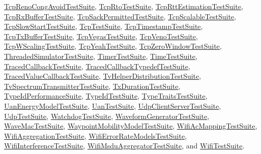\hyperlink{classTcpRenoCongAvoidTestSuite}{Tcp\+Reno\+Cong\+Avoid\+Test\+Suite}, \hyperlink{classTcpRtoTestSuite}{Tcp\+Rto\+Test\+Suite}, \hyperlink{classTcpRttEstimationTestSuite}{Tcp\+Rtt\+Estimation\+Test\+Suite}, \hyperlink{classTcpRxBufferTestSuite}{Tcp\+Rx\+Buffer\+Test\+Suite}, \hyperlink{classTcpSackPermittedTestSuite}{Tcp\+Sack\+Permitted\+Test\+Suite}, \hyperlink{classTcpScalableTestSuite}{Tcp\+Scalable\+Test\+Suite}, \hyperlink{classTcpSlowStartTestSuite}{Tcp\+Slow\+Start\+Test\+Suite}, \hyperlink{classTcpTestSuite}{Tcp\+Test\+Suite}, \hyperlink{classTcpTimestampTestSuite}{Tcp\+Timestamp\+Test\+Suite}, \hyperlink{classTcpTxBufferTestSuite}{Tcp\+Tx\+Buffer\+Test\+Suite}, \hyperlink{classTcpVegasTestSuite}{Tcp\+Vegas\+Test\+Suite}, \hyperlink{classTcpVenoTestSuite}{Tcp\+Veno\+Test\+Suite}, \hyperlink{classTcpWScalingTestSuite}{Tcp\+W\+Scaling\+Test\+Suite}, \hyperlink{classTcpYeahTestSuite}{Tcp\+Yeah\+Test\+Suite}, \hyperlink{classTcpZeroWindowTestSuite}{Tcp\+Zero\+Window\+Test\+Suite}, \hyperlink{classThreadedSimulatorTestSuite}{Threaded\+Simulator\+Test\+Suite}, \hyperlink{classTimerTestSuite}{Timer\+Test\+Suite}, \hyperlink{classTimeTestSuite}{Time\+Test\+Suite}, \hyperlink{classTracedCallbackTestSuite}{Traced\+Callback\+Test\+Suite}, \hyperlink{classTracedCallbackTypedefTestSuite}{Traced\+Callback\+Typedef\+Test\+Suite}, \hyperlink{classTracedValueCallbackTestSuite}{Traced\+Value\+Callback\+Test\+Suite}, \hyperlink{classTvHelperDistributionTestSuite}{Tv\+Helper\+Distribution\+Test\+Suite}, \hyperlink{classTvSpectrumTransmitterTestSuite}{Tv\+Spectrum\+Transmitter\+Test\+Suite}, \hyperlink{classTxDurationTestSuite}{Tx\+Duration\+Test\+Suite}, \hyperlink{classTypeIdPerformanceSuite}{Type\+Id\+Performance\+Suite}, \hyperlink{classTypeIdTestSuite}{Type\+Id\+Test\+Suite}, \hyperlink{classTypeTraitsTestSuite}{Type\+Traits\+Test\+Suite}, \hyperlink{classUanEnergyModelTestSuite}{Uan\+Energy\+Model\+Test\+Suite}, \hyperlink{classUanTestSuite}{Uan\+Test\+Suite}, \hyperlink{classUdpClientServerTestSuite}{Udp\+Client\+Server\+Test\+Suite}, \hyperlink{classUdpTestSuite}{Udp\+Test\+Suite}, \hyperlink{classWatchdogTestSuite}{Watchdog\+Test\+Suite}, \hyperlink{classWaveformGeneratorTestSuite}{Waveform\+Generator\+Test\+Suite}, \hyperlink{classWaveMacTestSuite}{Wave\+Mac\+Test\+Suite}, \hyperlink{structWaypointMobilityModelTestSuite}{Waypoint\+Mobility\+Model\+Test\+Suite}, \hyperlink{classWifiAcMappingTestSuite}{Wifi\+Ac\+Mapping\+Test\+Suite}, \hyperlink{classWifiAggregationTestSuite}{Wifi\+Aggregation\+Test\+Suite}, \hyperlink{classWifiErrorRateModelsTestSuite}{Wifi\+Error\+Rate\+Models\+Test\+Suite}, \hyperlink{classWifiInterferenceTestSuite}{Wifi\+Interference\+Test\+Suite}, \hyperlink{classWifiMsduAggregatorTestSuite}{Wifi\+Msdu\+Aggregator\+Test\+Suite}, and \hyperlink{classWifiTestSuite}{Wifi\+Test\+Suite}.



